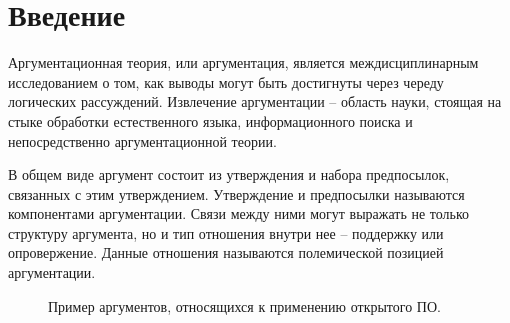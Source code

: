 \section{Введение}
\label{sec:Chapter1} 
Аргументационная теория, или аргументация, является междисциплинарным исследованием о том, как выводы могут быть достигнуты через череду логических рассуждений. Извлечение аргументации – область науки, стоящая на стыке обработки естественного языка, информационного поиска и непосредственно аргументационной теории.

В общем виде аргумент состоит из утверждения и набора предпосылок, связанных с этим утверждением. Утверждение и предпосылки называются компонентами аргументации. Связи между ними могут выражать не только структуру аргумента, но и тип отношения внутри нее – поддержку или опровержение. Данные отношения называются полемической позицией аргументации.
\begin{figure}[H]
 \setcounter{figure}{0}
 \caption{Пример аргументов, относящихся к применению открытого ПО.}
\end{figure}


